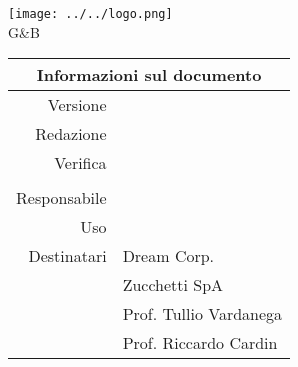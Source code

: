 	\maketitle
	\begin{center}
	\texttt{[image: ../../logo.png]}\newline
	\huge \version 
	\\G\&B
	
	\begin{table}[h!]
		\centering
		\begin{tabular}{r|l}
			\multicolumn{2}{c}{Informazioni sul documento}\\
			\hline
			Versione & \version \\
			Redazione & \red \\
			Verifica & \verp\\
			& \vers\\
			Responsabile & \res\\
			Uso & \use\\
			Destinatari & Dream Corp. \\
			& Zucchetti SpA\\
			& Prof. Tullio Vardanega\\
			& Prof. Riccardo Cardin\\
		\end{tabular}
	\end{table}
	
	\end{center}
	\newpage
	
	~\newpage
	\newpage
	\tableofcontents
	\newpage